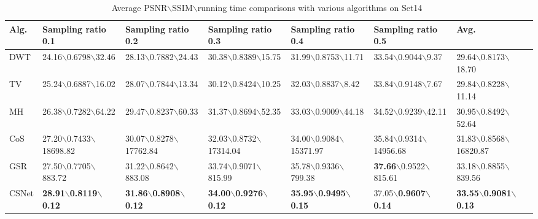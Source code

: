 \documentclass[5pt]{article}
\begin{document}
\begin{table*}[t]\footnotesize
\vspace{-3pt}
\centering
\caption{\small {Average PSNR$\backslash$SSIM$\backslash$running time comparisons with various algorithms on Set14~\cite{rf24}}}\label{tab:tab2}
\begin{tabular}{|l|l|l|l|l|l|l|}
\hline 
Alg. & Sampling ratio 0.1 & Sampling ratio 0.2 & Sampling ratio 0.3 & Sampling ratio 0.4 & Sampling ratio 0.5 & Avg.\\ 
\hline 
DWT & 24.16$\backslash$0.6798$\backslash$32.46 & 28.13$\backslash$0.7882$\backslash$24.43 & 30.38$\backslash$0.8389$\backslash$15.75 & 31.99$\backslash$0.8753$\backslash$11.71 & 33.54$\backslash$0.9044$\backslash$9.37 & 29.64$\backslash$0.8173$\backslash$18.70\\ 
\hline 
TV & 25.24$\backslash$0.6887$\backslash$16.02 & 28.07$\backslash$0.7844$\backslash$13.34 & 30.12$\backslash$0.8424$\backslash$10.25 & 32.03$\backslash$0.8837$\backslash$8.42 & 33.84$\backslash$0.9148$\backslash$7.67 & 29.84$\backslash$0.8228$\backslash$11.14\\ 
\hline 
MH & 26.38$\backslash$0.7282$\backslash$64.22 & 29.47$\backslash$0.8237$\backslash$60.33 & 31.37$\backslash$0.8694$\backslash$52.35 & 33.03$\backslash$0.9009$\backslash$44.18 & 34.52$\backslash$0.9239$\backslash$42.11 & 30.95$\backslash$0.8492$\backslash$52.64\\ 
\hline 
CoS & 27.20$\backslash$0.7433$\backslash$\tiny 18698.82 & 30.07$\backslash$0.8278$\backslash$\tiny 17762.84 & 32.03$\backslash$0.8732$\backslash$\tiny 17314.04 & 34.00$\backslash$0.9084$\backslash$\tiny 15371.97 & 35.84$\backslash$0.9314$\backslash$\tiny 14956.68 & 31.83$\backslash$0.8568$\backslash$\tiny 16820.87\\ 
\hline 
GSR & 27.50$\backslash$0.7705$\backslash$883.72 & 31.22$\backslash$0.8642$\backslash$883.08 & 33.74$\backslash$0.9071$\backslash$815.99 & 35.78$\backslash$0.9336$\backslash$799.38 & \textbf{37.66}$\backslash$0.9522$\backslash$815.61 & 33.18$\backslash$0.8855$\backslash$839.56\\ 
\hline 
CSNet & \textbf{28.91}$\backslash$\textbf{0.8119}$\backslash$\textbf{0.12} & \textbf{31.86}$\backslash$\textbf{0.8908}$\backslash$\textbf{0.12} & \textbf{34.00}$\backslash$\textbf{0.9276}$\backslash$\textbf{0.12} & \textbf{35.95}$\backslash$\textbf{0.9495}$\backslash$\textbf{0.15} & 37.05$\backslash$\textbf{0.9607}$\backslash$\textbf{0.14} & \textbf{33.55}$\backslash$\textbf{0.9081}$\backslash$\textbf{0.13}\\\hline 
\end{tabular}
\vspace{-15pt}
\end{table*} 
\end{document}
